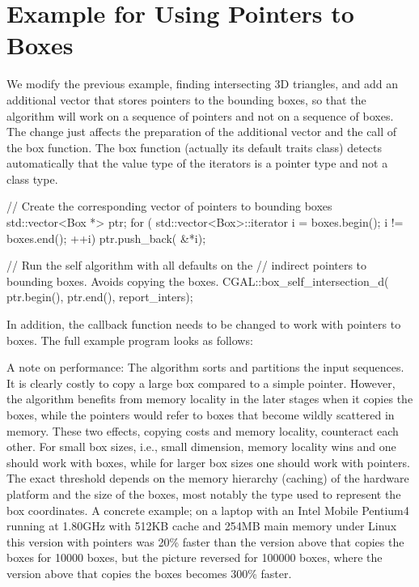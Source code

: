 

\section{Example for Using Pointers to Boxes}

We modify the previous example, finding intersecting 3D triangles,
and add an additional vector  that stores pointers to the bounding
boxes, so that the  algorithm will work on a sequence of
pointers and not on a sequence of boxes. The change just affects the
preparation of the additional vector and the call of the box 
function. The box  function (actually its default traits
class) detects automatically that the value type of the iterators is a
pointer type and not a class type.

\begin{ccExampleCode}
    // Create the corresponding vector of pointers to bounding boxes
    std::vector<Box *> ptr;
    for ( std::vector<Box>::iterator i = boxes.begin(); i != boxes.end(); ++i)
        ptr.push_back( &*i);
    
    // Run the self  algorithm with all defaults on the 
    // indirect pointers to bounding boxes. Avoids copying the boxes.
    CGAL::box_self_intersection_d( ptr.begin(), ptr.end(), report_inters);
\end{ccExampleCode}

In addition, the callback function  needs to be
changed to work with pointers to boxes. The full example program looks
as follows:


A note on performance: The algorithm sorts and partitions the input
sequences. It is clearly costly to copy a large box compared to a
simple pointer. However, the algorithm benefits from memory locality
in the later stages when it copies the boxes, while the pointers would
refer to boxes that become wildly scattered in memory.  These two
effects, copying costs and memory locality, counteract each other. For
small box sizes, i.e., small dimension, memory locality wins and one
should work with boxes, while for larger box sizes one should work
with pointers. The exact threshold depends on the memory hierarchy
(caching) of the hardware platform and the size of the boxes, most
notably the type used to represent the box coordinates. A concrete
example; on a laptop with an Intel Mobile Pentium4 running at 1.80GHz
with 512KB cache and 254MB main memory under Linux this version with
pointers was 20\% faster than the version above that copies the boxes
for 10000 boxes, but the picture reversed for 100000 boxes, where the
version above that copies the boxes becomes 300\% faster.

